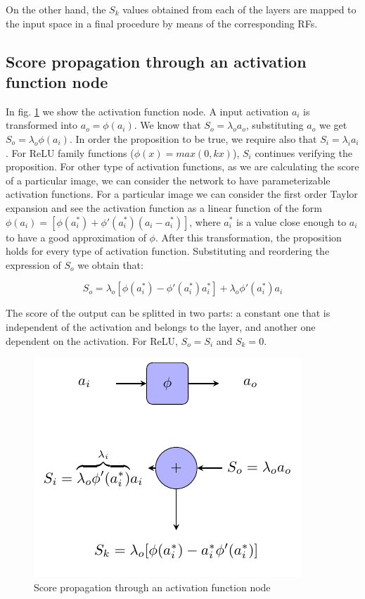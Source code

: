\documentclass[preprint]{elsarticle}
\theoremstyle{definition} %
\theoremstyle{remark}
\begin{document}
On the other hand, the $S_k$ values obtained from each of the layers are mapped to the input space in a final procedure by means of the corresponding RFs.

\subsection{Score propagation through an activation function node} 

In fig. \ref{fig:score_af} we show the activation function node. A input activation $a_i$ is transformed into $a_o = \phi(a_i)$. We know that $S_o = \lambda_o a_o$, substituting $a_o$ we get $S_o = \lambda_o \phi(a_i)$. In order the proposition to be true, we require also that $S_i = \lambda_i a_i$. For ReLU family functions ($\phi(x) = max(0, kx)$), $S_i$ continues verifying the proposition. For other type of activation functions, as we are calculating the score of a particular image, we can consider the network to have parameterizable activation functions. For a particular image we can consider the first order Taylor expansion and see the activation function as a linear function of the form $\phi(a_i) = [\phi(a^*_i) + \phi'(a^*_i)(a_i - a^*_i)]$, where $a^*_i$ is a value close enough to $a_i$ to have a good approximation of $\phi$. After this transformation, the proposition holds for every type of activation function. Substituting and reordering the expression of $S_o$ we obtain that:

\begin{equation}
	S_o = \lambda_o[\phi(a^*_i) - \phi'(a^*_i)a^*_i] + \lambda_o \phi'(a^*_i)a_i
\end{equation}

The score of the output can be splitted in two parts: a constant one that is independent of the activation and belongs to the layer, and another one dependent on the activation. For ReLU, $S_o = S_i$ and $S_k = 0$.

\begin{figure}[h!]
	\centering
	\includegraphics{figures/score_af.pdf}
	\caption{Score propagation through an activation function node}
	\label{fig:score_af}
\end{figure}
\end{document}
